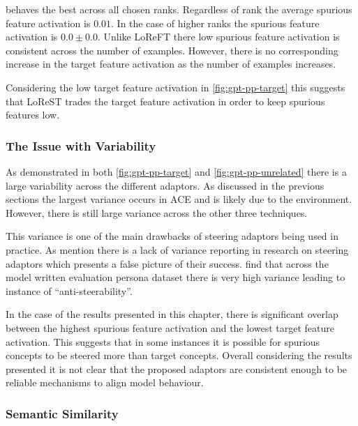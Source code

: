  behaves the best across all chosen ranks.
Regardless of rank the average spurious feature activation is $0.01$.
In the case of higher ranks the spurious feature activation is $0.0 \pm 0.0$.
Unlike LoReFT there low spurious feature activation is consistent across the number of examples.
However, there is no corresponding increase in the target feature activation as the number of examples increases.

Considering the low target feature activation in \cref{fig:gpt-pp-target} this suggests that LoReST trades the target feature activation in order to keep spurious features low.

\subsubsection{The Issue with Variability}
\label{sec:variability}

As demonstrated in both \cref{fig:gpt-pp-target} and \cref{fig:gpt-pp-unrelated} there is a large variability across the different adaptors.
As discussed in the previous sections the largest variance occurs in ACE and is likely due to the environment.
However, there is still large variance across the other three techniques.

This variance is one of the main drawbacks of steering adaptors being used in practice.
As \citet{steerability} mention there is a lack of variance reporting in research on steering adaptors which presents a false picture of their success.
\citet{steerability} find that across the model written evaluation persona dataset \citep{mwe} there is very high variance leading to instance of ``anti-steerability''.

In the case of the results presented in this chapter, there is significant overlap between the highest spurious feature activation and the lowest target feature activation.
This suggests that in some instances it is possible for spurious concepts to be steered more than target concepts.
Overall considering the results presented it is not clear that the proposed adaptors are consistent enough to be reliable mechanisms to align model behaviour.

\subsubsection{Semantic Similarity}

